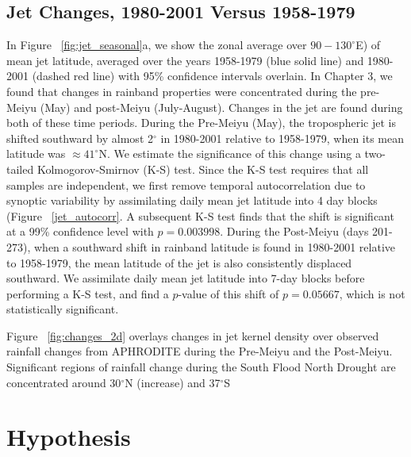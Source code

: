 \subsection{Jet Changes, 1980-2001 Versus 1958-1979}

	In Figure ~\ref{fig:jet_seasonal}a, we show the zonal average over $90-130^\circ$E) of mean jet latitude, averaged over the years 1958-1979 (blue solid line) and 1980-2001 (dashed red line) with 95\% confidence intervals overlain. In Chapter 3, we found that changes in rainband properties were concentrated during the pre-Meiyu (May) and post-Meiyu (July-August). Changes in the jet are found during both of these time periods. During the Pre-Meiyu (May), the tropospheric jet is shifted southward by almost 2$^{\circ}$ in 1980-2001 relative to 1958-1979, when its mean latitude was $\approx 41^{\circ}$N. We estimate the significance of this change using a two-tailed Kolmogorov-Smirnov (K-S) test. Since the K-S test requires that all samples are independent, we first remove temporal autocorrelation due to synoptic variability by assimilating daily mean jet latitude into 4 day blocks (Figure ~\ref{jet_autocorr}. A subsequent K-S test finds that the shift is significant at a 99\% confidence level with $p=0.003998$. During the Post-Meiyu (days 201-273), when a southward shift in rainband latitude is found in 1980-2001 relative to 1958-1979, the mean latitude of the jet is also consistently displaced southward. We assimilate daily mean jet latitude into 7-day blocks before performing a K-S test, and find a $p$-value of this shift of $p=0.05667$, which is not statistically significant.
	
	Figure ~\ref{fig:changes_2d} overlays changes in jet kernel density over observed rainfall changes from APHRODITE during the Pre-Meiyu and the Post-Meiyu. Significant regions of rainfall change during the South Flood North Drought are concentrated around 30$^{\circ}$N (increase) and 37$^{\circ}$S
	
\section{Hypothesis}

